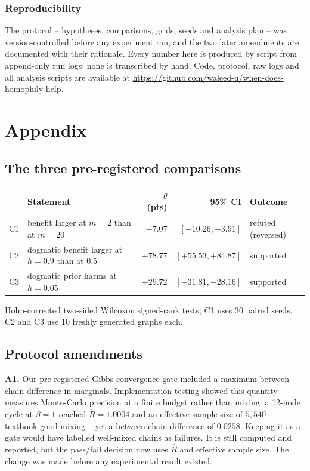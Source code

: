 \documentclass{article}
\begin{document}
\subsubsection*{Reproducibility}

The protocol -- hypotheses, comparisons, grids, seeds and analysis plan -- was version-controlled
before any experiment ran, and the two later amendments are documented with their rationale.
Every number here is produced by script from append-only run logs; none is transcribed by hand.
Code, protocol, raw logs and all analysis scripts are available at \url{https://github.com/waleed-u/when-does-homophily-help}.




\appendix
\section{Appendix}

\subsection{The three pre-registered comparisons}

\begin{center}
\small
\begin{tabular}{llrrl}
\toprule
& Statement & $\theta$ (pts) & 95\% CI & Outcome \\
\midrule
C1 & benefit larger at $m{=}2$ than at $m{=}20$ & $-7.07$ & $[-10.26,-3.91]$ & refuted (reversed) \\
C2 & dogmatic benefit larger at $h{=}0.9$ than at $0.5$ & $+78.77$ & $[+55.53,+84.87]$ & supported \\
C3 & dogmatic prior harms at $h{=}0.05$ & $-29.72$ & $[-31.81,-28.16]$ & supported \\
\bottomrule
\end{tabular}
\end{center}
Holm-corrected two-sided Wilcoxon signed-rank tests; C1 uses 30 paired seeds, C2 and C3 use 10
freshly generated graphs each.

\subsection{Protocol amendments}

\textbf{A1.} Our pre-registered Gibbs convergence gate included a maximum between-chain
difference in marginals. Implementation testing showed this quantity measures Monte-Carlo
precision at a finite budget rather than mixing: a 12-node cycle at $\beta=1$ reached
$\hat{R}=1.0004$ and an effective sample size of $5{,}540$ -- textbook good mixing -- yet a
between-chain difference of $0.0258$. Keeping it as a gate would have labelled well-mixed chains
as failures. It is still computed and reported, but the pass/fail decision now uses $\hat{R}$ and
effective sample size. The change was made before any experimental result existed.
\end{document}
